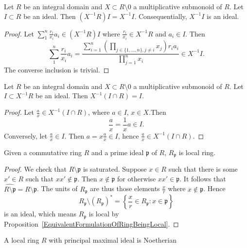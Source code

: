 \begin{lemma}\label{LocalizationIdealsDescribeIdealsGeneratedFromIdealsInSubring}
    Let $R$ be an integral domain and $X\subset R\setminus 0$ a multiplicative submonoid of $R$. Let $I\subset R$ be an ideal. Then $(X^{-1}R)I = X^{-1}I$. Consequentially, $X^{-1}I$ is an ideal.
\end{lemma}
\begin{proof}
    Let $\sum_1^n \frac{r_i}{x_i}a_i\in (X^{-1}R)I$ where $\frac{r_i}{x_i}\in X^{-1}R$ and $a_i\in I$. Then 
    $$\sum_1^n \frac{r_i}{x_i}a_i= \frac{\sum_{i=1}^n\left(\prod_{j\in \{1,\dots,n\}, j\neq i} x_j\right) r_ia_i}{\prod_{j=1}^n x_i}\in X^{-1}I.$$
    The converse inclusion is trivial. 
\end{proof}
\begin{lemma}\label{LocalizationOfEliminationIdealGenerateOriginalIdeal}
    Let $R$ be an integral domain and $X\subset R\setminus 0$ a multiplicative submonoid of $R$. Let $I\subset X^{-1}R$ be an ideal. Then $X^{-1}(I\cap R) = I$.
\end{lemma}
\begin{proof}
    Let $\frac{a}{x}\in X^{-1}(I\cap R)$, where $a\in I$, $x\in X$.Then 
    $$\frac{a}{x}=\frac{1}{x}a\in I.$$
    Conversely, let $\frac{a}{x}\in I$. Then $a=x\frac{a}{x}\in I$, hence $\frac{a}{x}\in X^{-1}(I\cap R)$.
\end{proof}
\begin{proposition}
    Given a commutative ring $R$ and a prime ideal $\mathfrak{p}$ of $R$, $R_\mathfrak{p}$ is local ring. 
\end{proposition}
\begin{proof}
    We check that $R\setminus \mathfrak{p}$ is saturated. Suppose $x\in R$ such that there is some $x'\in R$ such that $xx'\notin \mathfrak{p}$. Then $x\notin \mathfrak{p}$ for otherwise $xx'\in \mathfrak{p}$. It follows that $\widehat{R\setminus\mathfrak{p}} = R\setminus \mathfrak{p}$. The units of $R_\mathfrak{p}$ are thus those elements $\frac{x}{r}$ where $x\notin \mathfrak{p}$. Hence 
    $$
        R_\mathfrak{p}\setminus \left(R_\mathfrak{p}\right)^\ast = \left\{\frac{x}{r}\in R_\mathfrak{p} : x\in \mathfrak{p}\right\}
    $$
    is an ideal, which means $R_\mathfrak{p}$ is local by Proposition~\ref{EquivalentFormulationOfRingBeingLocal}.
\end{proof}
\begin{lemma}
    A local ring $R$ with principal maximal ideal is Noetherian 
\end{lemma}
